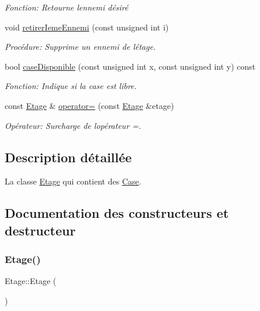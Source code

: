 \begin{DoxyCompactItemize}
\begin{DoxyCompactList}\small\item\em Fonction\+: Retourne l\textquotesingle{}ennemi désiré \end{DoxyCompactList}\item 
void \mbox{\hyperlink{classEtage_a68d7621769f9c9668a33f7b56ca7a092}{retirer\+Ieme\+Ennemi}} (const unsigned int i)
\begin{DoxyCompactList}\small\item\em Procédure\+: Supprime un ennemi de l\textquotesingle{}étage. \end{DoxyCompactList}\item 
bool \mbox{\hyperlink{classEtage_aab5719b8d6ae5a06b7aa39136bd5e03a}{case\+Disponible}} (const unsigned int x, const unsigned int y) const
\begin{DoxyCompactList}\small\item\em Fonction\+: Indique si la case est libre. \end{DoxyCompactList}\item 
const \mbox{\hyperlink{classEtage}{Etage}} \& \mbox{\hyperlink{classEtage_abc5f691a5a4dd0fd15e308ade202783f}{operator=}} (const \mbox{\hyperlink{classEtage}{Etage}} \&etage)
\begin{DoxyCompactList}\small\item\em Opérateur\+: Surcharge de l\textquotesingle{}opérateur =. \end{DoxyCompactList}\end{DoxyCompactItemize}


\subsection{Description détaillée}
La classe \mbox{\hyperlink{classEtage}{Etage}} qui contient des \mbox{\hyperlink{structCase}{Case}}. 

\subsection{Documentation des constructeurs et destructeur}
\mbox{\label{classEtage_a2d0d40584e7e995f60ddda571cd79415}} 
\subsubsection{\texorpdfstring{Etage()}{Etage()}\hspace{0.1cm}{\footnotesize\ttfamily [1/2]}}
{\footnotesize\ttfamily Etage\+::\+Etage (\begin{DoxyParamCaption}{ }\end{DoxyParamCaption})}



